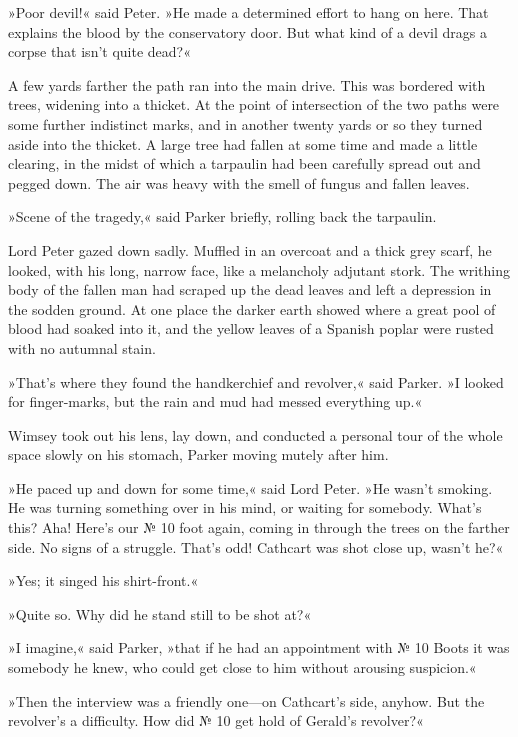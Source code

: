 »Poor devil!« said Peter. »He made a determined effort to hang on here. That explains the blood by the conservatory door. But what kind of a devil drags a corpse that isn't quite dead?«

A few yards farther the path ran into the main drive. This was bordered with trees, widening into a thicket. At the point of intersection of the two paths were some further indistinct marks, and in another twenty yards or so they turned aside into the thicket. A large tree had fallen at some time and made a little clearing, in the midst of which a tarpaulin had been carefully spread out and pegged down. The air was heavy with the smell of fungus and fallen leaves.

»Scene of the tragedy,« said Parker briefly, rolling back the tarpaulin.

Lord Peter gazed down sadly. Muffled in an overcoat and a thick grey scarf, he looked, with his long, narrow face, like a melancholy adjutant stork. The writhing body of the fallen man had scraped up the dead leaves and left a depression in the sodden ground. At one place the darker earth showed where a great pool of blood had soaked into it, and the yellow leaves of a Spanish poplar were rusted with no autumnal stain.

»That's where they found the handkerchief and revolver,« said Parker. »I looked for finger-marks, but the rain and mud had messed everything up.«

Wimsey took out his lens, lay down, and conducted a personal tour of the whole space slowly on his stomach, Parker moving mutely after him.

»He paced up and down for some time,« said Lord Peter. »He wasn't smoking. He was turning something over in his mind, or waiting for somebody. What's this? Aha! Here's our № 10 foot again, coming in through the trees on the farther side. No signs of a struggle. That's odd! Cathcart was shot close up, wasn't he?«

»Yes; it singed his shirt-front.«

»Quite so. Why did he stand still to be shot at?«

»I imagine,« said Parker, »that if he had an appointment with № 10 Boots it was somebody he knew, who could get close to him without arousing suspicion.«

»Then the interview was a friendly one\allowbreak---\allowbreak on Cathcart's side, anyhow. But the revolver's a difficulty. How did № 10 get hold of Gerald's revolver?«


